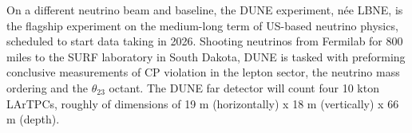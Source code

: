 On a different neutrino beam and baseline, the DUNE  experiment, n\'ee LBNE\cite{Adams:2013qkq},  is the flagship experiment on the medium-long term of US-based neutrino physics, scheduled to start data taking in 2026. Shooting neutrinos from Fermilab for 800 miles to the SURF laboratory in South Dakota, DUNE is tasked with preforming conclusive measurements of CP violation in the lepton sector,  the neutrino mass ordering and the $\theta_{23}$ octant. The DUNE far detector will count four 10 kton LArTPCs, roughly of dimensions of  19 m (horizontally) x 18 m (vertically) x 66 m (depth).

